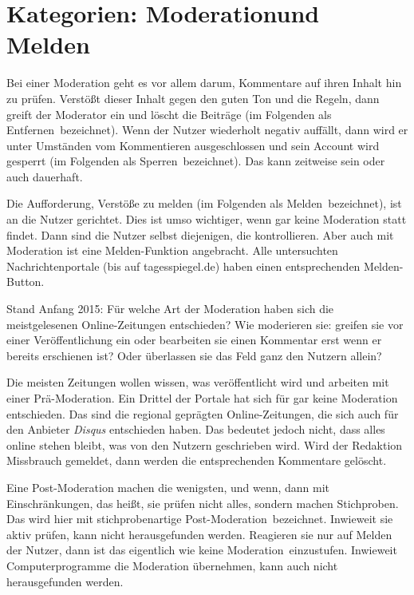 \section{Kategorien: \glqq Moderation\grqq und \glqq Melden\grqq}

Bei einer Moderation geht es vor allem darum, Kommentare auf ihren Inhalt hin zu
prüfen. Verstößt dieser Inhalt gegen den guten Ton und die Regeln, dann greift
der Moderator ein und löscht die Beiträge (im Folgenden als \glqq
Entfernen\grqq\ bezeichnet). Wenn der Nutzer wiederholt negativ auffällt, dann
wird er unter Umständen vom Kommentieren ausgeschlossen und sein Account wird
gesperrt (im Folgenden als  \glqq Sperren\grqq\ bezeichnet). Das kann zeitweise
sein oder auch dauerhaft.

Die Aufforderung, Verstöße zu melden (im Folgenden als \glqq Melden\grqq\
bezeichnet), ist an die Nutzer gerichtet. Dies ist umso wichtiger, wenn gar
keine Moderation statt findet. Dann sind die Nutzer selbst diejenigen, die
kontrollieren. Aber auch mit Moderation ist eine Melden-Funktion angebracht.
Alle  untersuchten Nachrichtenportale (bis auf tagesspiegel.de) haben einen
entsprechenden Melden-Button.

Stand Anfang 2015: Für welche Art der Moderation haben sich die meistgelesenen
Online-Zeitungen entschieden? Wie moderieren sie: greifen sie vor einer
Veröffentlichung ein oder bearbeiten sie einen Kommentar erst wenn er bereits
erschienen ist? Oder überlassen sie das Feld ganz den Nutzern allein?

Die meisten Zeitungen wollen wissen, was veröffentlicht wird und arbeiten mit
einer Prä-Moderation.  Ein Drittel der Portale hat sich für gar keine Moderation
entschieden. Das sind die regional geprägten Online-Zeitungen, die sich auch für
den Anbieter {\slshape Disqus} entschieden haben. Das bedeutet jedoch nicht,
dass alles online stehen bleibt, was von den Nutzern geschrieben wird.  Wird der
Redaktion Missbrauch gemeldet, dann werden die entsprechenden Kommentare
gelöscht.

Eine Post-Moderation machen die wenigsten, und wenn, dann mit Einschränkungen,
das heißt, sie prüfen nicht alles, sondern machen Stichproben. Das wird hier mit
\glqq stichprobenartige Post-Moderation\grqq\ bezeichnet. Inwieweit sie aktiv prüfen,
kann nicht herausgefunden werden. Reagieren sie nur auf Melden der Nutzer, dann
ist das eigentlich wie \glqq keine Moderation\grqq\ einzustufen.
Inwieweit Computerprogramme die Moderation übernehmen, kann auch nicht
herausgefunden werden.

